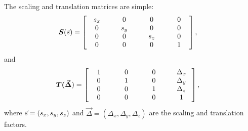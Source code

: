 \newcommand\pc[1]{\phantom{ml}#1\phantom{ml}}
The scaling and translation matrices are simple:
%
\begin{align}
\boldsymbol{S}(\s) &= \bmat{
   s_x  &  0   & 0  & 0 \\
   0    &  s_y  &  0    &  0 \\
   0    &  0    &  s_z  &  0 \\
   \pc{0}    &  \pc{0}    &  \pc{0}    & \pc{1} \\
  },
  \end{align}
%
and
%
\begin{align}
\boldsymbol{T(\vec\Delta}) &= \bmat{
	1  &  0  &  0  &  \Delta_x \\
	0  &  1  &  0  &  \Delta_y \\
	0  &  0  &  1  &  \Delta_z \\
 \pc{0}  &   \pc{0}  &   \pc{0}  &   \pc{1} \\
},
\end{align}
%
where $\vec s = (s_x, s_y, s_z)$ and $\vec\Delta = (\Delta_x, \Delta_y, \Delta_z)$ are the scaling and translation factors.

